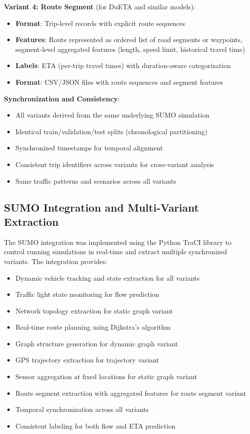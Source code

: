 \textbf{Variant 4: Route Segment} (for DuETA and similar models):
\begin{itemize}
    \item \textbf{Format}: Trip-level records with explicit route sequences
    \item \textbf{Features}: Route represented as ordered list of road segments or waypoints, segment-level aggregated features (length, speed limit, historical travel time)
    \item \textbf{Labels}: ETA (per-trip travel times) with duration-aware categorization
    \item \textbf{Format}: CSV/JSON files with route sequences and segment features
\end{itemize}

\textbf{Synchronization and Consistency}:
\begin{itemize}
    \item All variants derived from the same underlying SUMO simulation
    \item Identical train/validation/test splits (chronological partitioning)
    \item Synchronized timestamps for temporal alignment
    \item Consistent trip identifiers across variants for cross-variant analysis
    \item Same traffic patterns and scenarios across all variants
\end{itemize}

\subsection{SUMO Integration and Multi-Variant Extraction}

The SUMO integration was implemented using the Python TraCI library to control running simulations in real-time and extract multiple synchronized variants. The integration provides:

\begin{itemize}
    \item Dynamic vehicle tracking and state extraction for all variants
    \item Traffic light state monitoring for flow prediction
    \item Network topology extraction for static graph variant
    \item Real-time route planning using Dijkstra's algorithm
    \item Graph structure generation for dynamic graph variant
    \item GPS trajectory extraction for trajectory variant
    \item Sensor aggregation at fixed locations for static graph variant
    \item Route segment extraction with aggregated features for route segment variant
    \item Temporal synchronization across all variants
    \item Consistent labeling for both flow and ETA prediction
\end{itemize}

